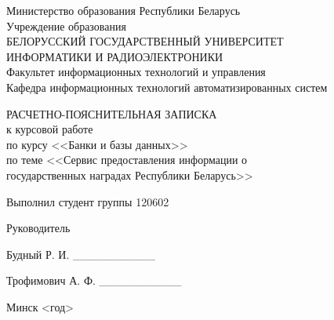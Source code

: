 \setlength{\parindent}{0ex} %


\begin{center}
  Министерство образования Республики Беларусь \\
  \smallskip
  Учреждение образования \\
  БЕЛОРУССКИЙ ГОСУДАРСТВЕННЫЙ УНИВЕРСИТЕТ \\
  ИНФОРМАТИКИ И РАДИОЭЛЕКТРОНИКИ \\
  \smallskip
  Факультет информационных технологий и управления \\
  \smallskip
  Кафедра информационных технологий автоматизированных систем
\end{center}

\vspace{60mm}

\begin{center}
  РАСЧЕТНО-ПОЯСНИТЕЛЬНАЯ ЗАПИСКА \\
  к курсовой работе \\
  по курсу <<Банки и базы данных>> \\
  по теме <<Сервис предоставления информации о \\ государственных наградах Республики Беларусь>> \\
\end{center}

\vspace{30mm}

\begin{minipage}{.45\linewidth}
    Выполнил студент группы 120602 

    \smallskip

    Руководитель 
\end{minipage}
\hfill
\begin{minipage}{.5\linewidth}
  \begin{flushright}
    Будный Р. И. \_\_\_\_\_\_\_\_\_\_

    \smallskip

    Трофимович А. Ф. \_\_\_\_\_\_\_\_\_\_
  \end{flushright}
\end{minipage}

\vspace{60mm}
\begin{center}
  Минск <год>
\end{center}

\setlength{\parindent}{5ex} %
